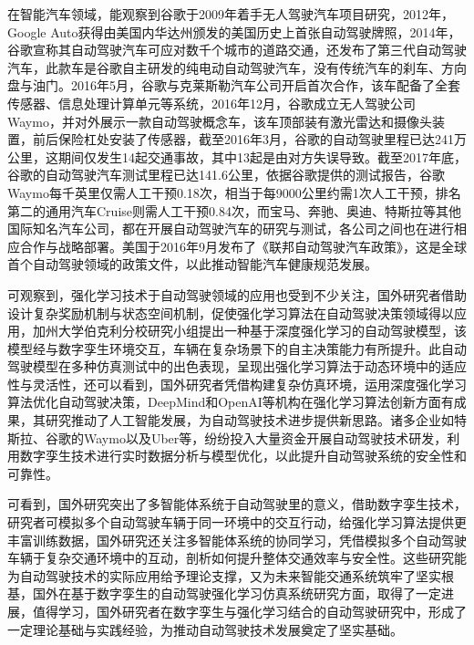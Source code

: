 在智能汽车领域，能观察到谷歌于2009年着手无人驾驶汽车项目研究，2012年，Google Auto获得由美国内华达州颁发的美国历史上首张自动驾驶牌照，2014年，谷歌宣称其自动驾驶汽车可应对数千个城市的道路交通，还发布了第三代自动驾驶汽车，此款车是谷歌自主研发的纯电动自动驾驶汽车，没有传统汽车的刹车、方向盘与油门。2016年5月，谷歌与克莱斯勒汽车公司开启首次合作，该车配备了全套传感器、信息处理计算单元等系统，2016年12月，谷歌成立无人驾驶公司Waymo，并对外展示一款自动驾驶概念车，该车顶部装有激光雷达和摄像头装置，前后保险杠处安装了传感器，截至2016年3月，谷歌的自动驾驶里程已达241万公里，这期间仅发生14起交通事故，其中13起\cite{janai2020computer}是由对方失误导致。截至2017年底，谷歌的自动驾驶汽车测试里程已达141.6公里，依据谷歌提供的测试报告，谷歌Waymo每千英里仅需人工干预0.18次，相当于每9000公里约需1次人工干预，排名第二的通用汽车Cruise则需人工干预0.84次，而宝马、奔驰、奥迪、特斯拉等其他国际知名汽车公司，都在开展自动驾驶汽车的研究与测试，各公司之间也在进行相应合作与战略部署。美国于2016年9月发布了《联邦自动驾驶汽车政策》，这是全球首个自动驾驶领域的政策文件\cite{陈燕申2017美国政府}，以此推动智能汽车健康规范发展。

可观察到，强化学习技术于自动驾驶领域的应用也受到不少关注，国外研究者借助设计复杂奖励机制与状态空间机制，促使强化学习算法在自动驾驶决策领域得以应用，加州大学伯克利分校研究小组提出一种基于深度强化学习的自动驾驶模型，该模型经与数字孪生环境交互，车辆在复杂场景下的自主决策能力有所提升。此自动驾驶模型在多种仿真测试中的出色表现，呈现出强化学习算法于动态环境中的适应性与灵活性，还可以看到，国外研究者凭借构建复杂仿真环境，运用深度强化学习算法优化自动驾驶决策，DeepMind和OpenAI等机构在强化学习算法创新方面有成果，其研究推动了人工智能发展，为自动驾驶技术进步提供新思路。诸多企业如特斯拉、谷歌的Waymo以及Uber等，纷纷投入大量资金开展自动驾驶技术研发，利用数字孪生技术进行实时数据分析与模型优化，以此提升自动驾驶系统的安全性和可靠性。

可看到，国外研究突出了多智能体系统于自动驾驶里的意义，借助数字孪生技术，研究者可模拟多个自动驾驶车辆于同一环境中的交互行动，给强化学习算法提供更丰富训练数据，国外研究还关注多智能体系统的协同学习，凭借模拟多个自动驾驶车辆于复杂交通环境中的互动，剖析如何提升整体交通效率与安全性。这些研究能为自动驾驶技术的实际应用给予理论支撑，又为未来智能交通系统筑牢了坚实根基，国外在基于数字孪生的自动驾驶强化学习仿真系统研究方面，取得了一定进展，值得学习，国外研究者在数字孪生与强化学习结合的自动驾驶研究中，形成了一定理论基础与实践经验，为推动自动驾驶技术发展奠定了坚实基础。




\begin{tabular}{l l}
\end{tabular}


